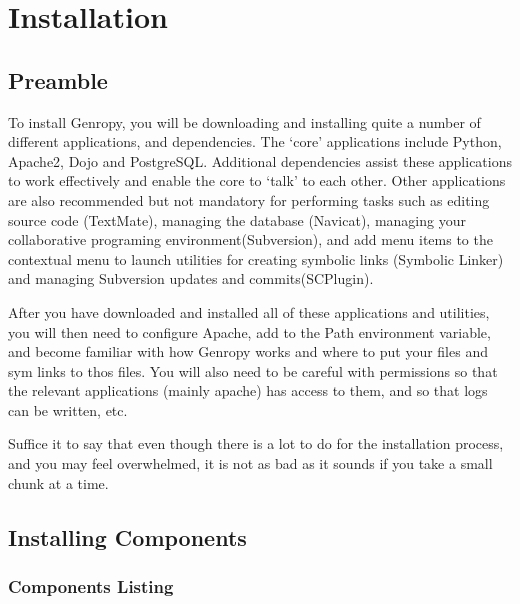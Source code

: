 \chapter{Installation} %
\label{cha:installation}

\section{Preamble} %
\label{sec:Preamble}
To install Genropy, you will be downloading and installing quite a number of different applications, and dependencies.  The `core' applications include Python, Apache2, Dojo and PostgreSQL.  Additional dependencies assist these applications to work effectively and enable the core to `talk' to each other.  Other applications are also recommended but not mandatory for performing tasks such as editing source code (TextMate), managing the database (Navicat), managing your collaborative programing environment(Subversion), and add menu items to the contextual menu to launch utilities for creating symbolic links (Symbolic Linker) and managing Subversion updates and commits(SCPlugin).

After you have downloaded and installed all of these applications and utilities, you will then need to configure Apache, add to the Path environment variable, and become familiar with how Genropy works and where to put your files and sym links to thos files.  You will also need to be careful with permissions so that the relevant applications (mainly apache) has access to them, and so that logs can be written, etc.

Suffice it to say that even though there is a lot to do for the installation process, and you may feel overwhelmed, it is not as bad as it sounds if you take a small chunk at a time.




\section{Installing Components} %
\label{sec:Installing Components}

\subsection{Components Listing} %
\label{sub:Components_Listing}

